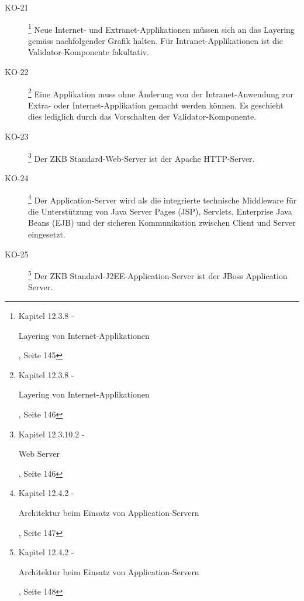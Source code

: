 \begin{description}
    \item[KO-21\label{itm:KO-21}]
    \footnote{\cite{ZkbHandbuchDerItArchitektur} Kapitel 12.3.8 -
    \begin{itshape}Layering von Internet-Applikationen\end{itshape}, Seite 145}
    Neue Internet- und Extranet-Applikationen müssen sich an das Layering
    gemäss nachfolgender Grafik halten. Für Intranet-Applikationen ist die
    Validator-Komponente fakultativ.
    
    \item[KO-22\label{itm:KO-22}]
    \footnote{\cite{ZkbHandbuchDerItArchitektur} Kapitel 12.3.8 -
    \begin{itshape}Layering von Internet-Applikationen\end{itshape}, Seite 146}
    Eine Applikation muss ohne Änderung von der Intranet-Anwendung zur Extra-
    oder Internet-Applikation gemacht werden können. Es geschieht dies
    lediglich durch das Vorschalten der Validator-Komponente.
    
    \item[KO-23\label{itm:KO-23}]
    \footnote{\cite{ZkbHandbuchDerItArchitektur} Kapitel 12.3.10.2 -
    \begin{itshape}Web Server\end{itshape}, Seite 146}
    Der ZKB Standard-Web-Server ist der Apache HTTP-Server.
    
    \item[KO-24\label{itm:KO-24}]
    \footnote{\cite{ZkbHandbuchDerItArchitektur} Kapitel 12.4.2 -
    \begin{itshape}Architektur beim Einsatz von
    Application-Servern\end{itshape}, Seite 147}
    Der Application-Server wird als die integrierte technische Middleware für
    die Unterstützung von Java Server Pages (JSP), Servlets, Enterprise Java
    Beans (EJB) und der sicheren Kommunikation zwischen Client und Server
    eingesetzt.
    
    \item[KO-25\label{itm:KO-25}]
    \footnote{\cite{ZkbHandbuchDerItArchitektur} Kapitel 12.4.2 -
    \begin{itshape}Architektur beim Einsatz von
    Application-Servern\end{itshape}, Seite 148}
    Der ZKB Standard-J2EE-Application-Server ist der JBoss Application Server.
    

\end{description}
